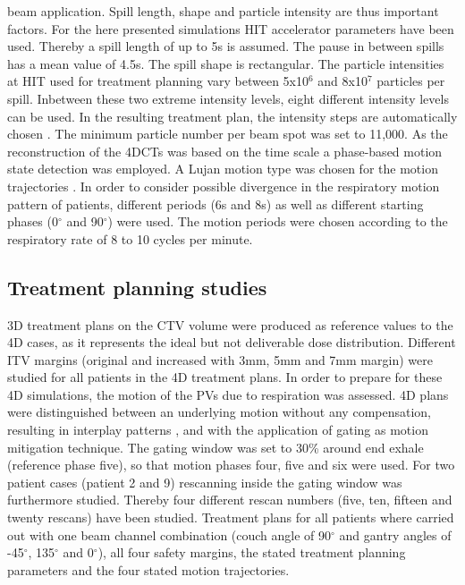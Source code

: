 beam application. Spill length, shape and particle intensity are thus important factors. For the here presented simulations HIT accelerator 
parameters have been used. Thereby a spill length of up to 5s is assumed. The pause in between spills has a mean value of 4.5s. The spill 
shape is rectangular. The particle intensities at HIT used for treatment planning vary between 5x10$^{6}$ and 8x10$^{7}$ particles per spill. 
Inbetween these two extreme intensity levels, eight different intensity levels can be used. In the resulting treatment plan, the intensity 
steps are automatically chosen \cite{Krae00, Ric13}. The minimum particle number per beam spot was set to 11,000.\newline
\newline
As the reconstruction of the 4DCTs was based on the time scale a phase-based motion state detection was employed. 
A Lujan motion type was chosen for the motion trajectories \cite{Luj99}. In order to consider possible divergence in the respiratory motion 
pattern of patients, different periods (6s and 8s) as well as different starting phases (0$^{\circ}$ and 90$^{\circ}$) were used. 
The motion periods were chosen according to the respiratory rate of 8 to 10 cycles per minute. 

\newpage

\subsection{Treatment planning studies}

3D treatment plans on the CTV volume were produced as reference values to the 4D cases, as it represents the ideal but not deliverable dose 
distribution. Different ITV margins (original and increased with 3mm, 5mm and 7mm margin) were studied for all patients in the 4D treatment plans. 
In order to prepare for these 4D simulations, the motion of the PVs due to respiration was assessed. 
4D plans were distinguished between an underlying motion without any compensation, resulting in interplay patterns \cite{Phi92, Ber08}, 
and with the application of gating \cite{Kub96} as motion mitigation technique. The gating window was set to 30\% around end exhale (reference 
phase five), so that motion phases four, five and six were used. For two patient cases (patient 2 and 9) rescanning inside the gating window 
was furthermore studied. Thereby four different rescan numbers (five, ten, fifteen and twenty rescans) have been studied. Treatment plans for 
all patients where carried out with one beam channel combination (couch angle of 90$^{\circ}$ and gantry angles of -45$^{\circ}$, 
135$^{\circ}$ and 0$^{\circ}$), all four safety margins, the stated treatment planning parameters and the four stated motion trajectories. 


